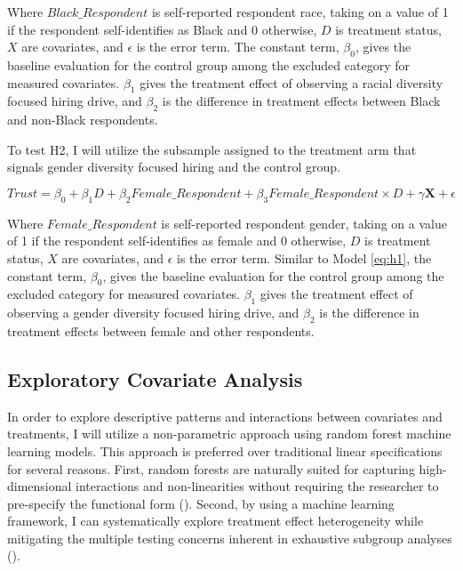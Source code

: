 \documentclass[12pt]{article}
\begin{document}
Where $Black\_Respondent$ is self-reported respondent race, taking on a value of 1 if the respondent self-identifies as Black and 0 otherwise, $D$ is treatment status, $X$ are covariates, and $\epsilon$ is the error term. The constant term, $\beta_0$, gives the baseline evaluation for the control group among the excluded category for measured covariates. $\beta_1$ gives the treatment effect of observing a racial diversity focused hiring drive, and $\beta_2$ is the difference in treatment effects between Black and non-Black respondents.

To test H2, I will utilize the subsample assigned to the treatment arm that signals gender diversity focused hiring and the control group. 

\begin{equation}
    Trust = \beta_0 + \beta_1 D + \beta_2 Female\_Respondent +  \beta_3 Female\_Respondent\times D  + \gamma \mathbf{X} + \epsilon
\end{equation}\label{eq:h1}

Where $Female\_Respondent$ is self-reported respondent gender, taking on a value of 1 if the respondent self-identifies as female and 0 otherwise, $D$ is treatment status, $X$ are covariates, and $\epsilon$ is the error term. Similar to Model \ref{eq:h1}, the constant term, $\beta_0$, gives the baseline evaluation for the control group among the excluded category for measured covariates. $\beta_1$ gives the treatment effect of observing a gender diversity focused hiring drive, and $\beta_2$ is the difference in treatment effects between female and other respondents.

\subsection{Exploratory Covariate Analysis}

In order to explore descriptive patterns and interactions between covariates and treatments, I will utilize a non-parametric approach using random forest machine learning models. This approach is preferred over traditional linear specifications for several reasons. First, random forests are naturally suited for capturing high-dimensional interactions and non-linearities without requiring the researcher to pre-specify the functional form (\cite{wager2018estimation}). Second, by using a machine learning framework, I can systematically explore treatment effect heterogeneity while mitigating the multiple testing concerns inherent in exhaustive subgroup analyses (\cite{imai2013estimating}).
\end{document}
